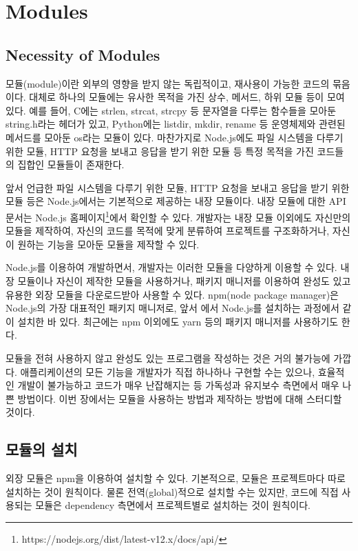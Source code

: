 \section{Modules}\label{sect:modules}

\subsection*{Necessity of Modules}

모듈(module)이란 외부의 영향을 받지 않는 독립적이고, 재사용이 가능한 코드의 묶음이다. 대체로 하나의 모듈에는 유사한 목적을 가진 상수, 메서드, 하위 모듈 등이 모여 있다. 예를 들어, C에는 strlen, strcat, strcpy 등 문자열을 다루는 함수들을 모아둔 string.h라는 헤더가 있고, Python에는 listdir, mkdir, rename 등 운영체제와 관련된 메서드를 모아둔 os라는 모듈이 있다. 마찬가지로 Node.js에도 파일 시스템을 다루기 위한 모듈, HTTP 요청을 보내고 응답을 받기 위한 모듈 등 특정 목적을 가진 코드들의 집합인 모듈들이 존재한다.

앞서 언급한 파일 시스템을 다루기 위한 모듈, HTTP 요청을 보내고 응답을 받기 위한 모듈 등은 Node.js에서는 기본적으로 제공하는 내장 모듈이다. 내장 모듈에 대한 API 문서는 Node.js 홈페이지\footnote{https://nodejs.org/dist/latest-v12.x/docs/api/}에서 확인할 수 있다. 개발자는 내장 모듈 이외에도 자신만의 모듈을 제작하여, 자신의 코드를 목적에 맞게 분류하여 프로젝트를 구조화하거나, 자신이 원하는 기능을 모아둔 모듈을 제작할 수 있다.

Node.js를 이용하여 개발하면서, 개발자는 이러한 모듈을 다양하게 이용할 수 있다. 내장 모듈이나 자신이 제작한 모듈을 사용하거나, 패키지 매니저를 이용하여 완성도 있고 유용한 외장 모듈을 다운로드받아 사용할 수 있다. npm(node package manager)은 Node.js의 가장 대표적인 패키지 매니저로, 앞서 에서 Node.js를 설치하는 과정에서 같이 설치한 바 있다. 최근에는 npm 이외에도 yarn 등의 패키지 매니저를 사용하기도 한다.

모듈을 전혀 사용하지 않고 완성도 있는 프로그램을 작성하는 것은 거의 불가능에 가깝다. 애플리케이션의 모든 기능을 개발자가 직접 하나하나 구현할 수는 있으나, 효율적인 개발이 불가능하고 코드가 매우 난잡해지는 등 가독성과 유지보수 측면에서 매우 나쁜 방법이다. 이번 장에서는 모듈을 사용하는 방법과 제작하는 방법에 대해 스터디할 것이다.

\subsection*{모듈의 설치}

외장 모듈은 npm을 이용하여 설치할 수 있다. 기본적으로, 모듈은 프로젝트마다 따로 설치하는 것이 원칙이다. 물론 전역(global)적으로 설치할 수는 있지만, 코드에 직접 사용되는 모듈은 dependency 측면에서 프로젝트별로 설치하는 것이 원칙이다.

